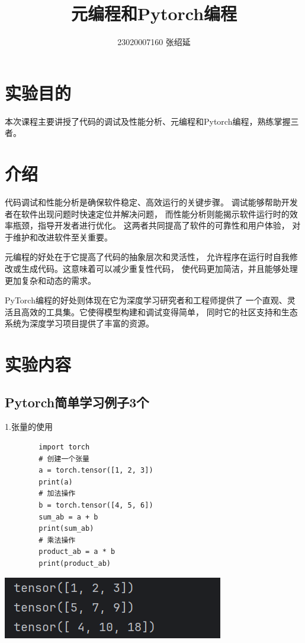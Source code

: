 \documentclass{article}
\title{元编程和Pytorch编程}
\author{23020007160  张绍延}
\begin{document}
	
	\maketitle
	
	\section{实验目的}
	本次课程主要讲授了代码的调试及性能分析、元编程和Pytorch编程，熟练掌握三者。
	
	\section{介绍}
	代码调试和性能分析是确保软件稳定、高效运行的关键步骤。
	调试能够帮助开发者在软件出现问题时快速定位并解决问题，
	而性能分析则能揭示软件运行时的效率瓶颈，指导开发者进行优化。
	这两者共同提高了软件的可靠性和用户体验，
	对于维护和改进软件至关重要。
	
	元编程的好处在于它提高了代码的抽象层次和灵活性，
	允许程序在运行时自我修改或生成代码。这意味着可以减少重复性代码，
	使代码更加简洁，并且能够处理更加复杂和动态的需求。
	
	PyTorch编程的好处则体现在它为深度学习研究者和工程师提供了
	一个直观、灵活且高效的工具集。它使得模型构建和调试变得简单，
	同时它的社区支持和生态系统为深度学习项目提供了丰富的资源。
	
	\section{实验内容}
	
	\subsection{Pytorch简单学习例子3个}
	1.张量的使用 
	\begin{verbatim}
		import torch
		# 创建一个张量
		a = torch.tensor([1, 2, 3])
		print(a)
		# 加法操作
		b = torch.tensor([4, 5, 6])
		sum_ab = a + b
		print(sum_ab)
		# 乘法操作
		product_ab = a * b
		print(product_ab)
	\end{verbatim}
	
	\begin{minipage}{\linewidth}
		\centering
		\includegraphics[width=0.5\linewidth]{example1.png}
		\label{fig:example}
	\end{minipage}
	
\end{document}
